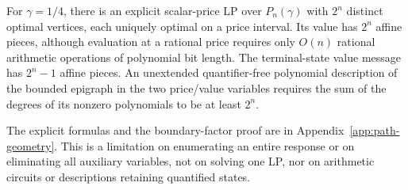 \begin{proposition}\label{prop:path-shadow-boundary}
For \(\gamma=1/4\), there is an explicit scalar-price LP over \(P_n(\gamma)\)
with \(2^n\) distinct optimal vertices, each uniquely optimal on a price
interval. Its value has \(2^n\) affine pieces, although evaluation at a
rational price requires only \(O(n)\) rational arithmetic operations of
polynomial bit length. The terminal-state value message has \(2^n-1\) affine
pieces. An unextended quantifier-free polynomial description of the bounded
epigraph in the two price/value variables requires the sum of the degrees of
its nonzero polynomials to be at least \(2^n\).
\end{proposition}
The explicit formulas and the boundary-factor proof are in
Appendix~\ref{app:path-geometry}. This is a limitation on enumerating an entire
response or on eliminating all auxiliary variables, not on solving one LP,
nor on arithmetic circuits or descriptions retaining quantified states.

